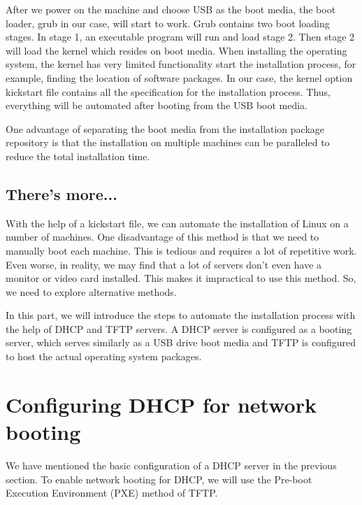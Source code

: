 After we power on the machine and choose USB as the boot media, the boot loader, grub in our case, will start to work. Grub contains two boot loading stages. In stage 1, an executable program will run and load stage 2. Then stage 2 will load the kernel which resides on boot media. When installing the operating system, the kernel has very limited functionality start the installation process, for example, finding the location of software packages. In our case, the kernel option kickstart file contains all the specification for the installation process. Thus, everything will be automated after booting from the USB boot media.

One advantage of separating the boot media from the installation package repository is that the installation on multiple machines can be paralleled to reduce the total installation time.

\subsection*{There's more...}
With the help of a kickstart file, we can automate the installation of Linux on a number of machines. One disadvantage of this method is that we need to manually boot each machine. This is tedious and requires a lot of repetitive work. Even worse, in reality, we may find that a lot of servers don't even have a monitor or video card installed. This makes it impractical to use this method. So, we need to explore alternative methods.

In this part, we will introduce the steps to automate the installation process with the help of DHCP and TFTP servers. A DHCP server is configured as a booting server, which serves similarly as a USB drive boot media and TFTP is configured to host the actual operating system packages.

\section{Configuring DHCP for network booting}
We have mentioned the basic configuration of a DHCP server in the previous section. To enable network booting for DHCP, we will use the Pre-boot Execution Environment (PXE) method of TFTP.

